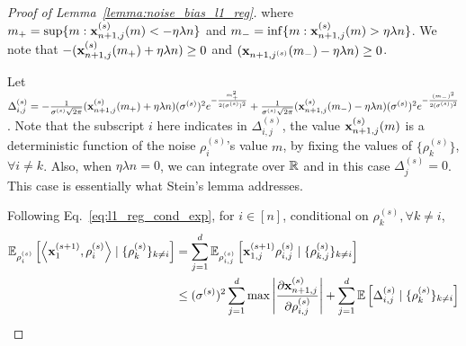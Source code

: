 \begin{proof}[Proof of Lemma~\ref{lemma:noise_bias_l1_reg}]
where $m_{+} = \sup\{m: {\mathbf{x}}_{n+1,j}^{(s)}(m) < -\eta \lambda n\}$ and $m_{-} = \inf\{m: {\mathbf{x}}_{n+1,j}^{(s)}(m) > \eta \lambda n\}$.
We note that $-({\mathbf{x}}_{n+1,j}^{(s)}(m_{+}) + \eta \lambda n) \geq 0$ and $({\mathbf{x}}_{n+1,j^{(s)}}(m_{-}) - \eta \lambda n) \geq 0$. 

Let $\Delta_{i, j}^{(s)} = -\frac{1}{\sigma^{(s)} \sqrt{2\pi}}({\mathbf{x}}_{n+1,j}^{(s)}(m_{+}) + \eta \lambda n) (\sigma^{(s)})^2 e^{-\frac{m_{+}^2}{2 (\sigma^{(s)})^2}}
+ \frac{1}{\sigma^{(s)} \sqrt{2\pi}} ({\mathbf{x}}_{n+1,j}^{(s)}(m_{-}) - \eta \lambda n) (\sigma^{(s)})^2 e^{-\frac{(m_{-})^{2}}{2 (\sigma^{(s)})^2}}$.
Note that the subscript $i$ here indicates in $\Delta_{i, j}^{(s)}$, the value ${\mathbf{x}}_{n+1,j}^{(s)}(m)$ is a deterministic function of the noise $\rho_{i}^{(s)}$'s value $m$, by fixing the values of $\{\rho_{k}^{(s)}\}$, $\forall i\neq k$.
Also, when $\eta \lambda n = 0$, we can integrate over $\mathbb{R}$ and in this case $\Delta_j^{(s)} = 0$. This case is essentially what Stein's lemma addresses. 


Following Eq.~\ref{eq:l1_reg_cond_exp}, for $i\in [n]$, conditional on $\rho_k^{(s)}, \forall k\neq i$,
\begin{align}
    \mathbb{E}_{\rho_i^{(s)}}\left[\left\langle {\mathbf{x}}_{1}^{(s+1)}, \rho_i^{(s)} \right\rangle \mid \{\rho_k^{(s)}\}_{k\neq i}\right]
    &= \sum_{j=1}^{d} \mathbb{E}_{\rho_{i,j}^{(s)}}\left[ {\mathbf{x}}_{1, j}^{(s+1)} \rho_{i, j}^{(s)} \mid \{\rho_{k, j}^{(s)}\}_{k \neq i}\right]\\
    &\leq (\sigma^{(s)})^2 \sum_{j=1}^{d} \max\left| \frac{\partial {\mathbf{x}}_{n+1,j}^{(s)}}{\partial \rho_{i, j}^{(s)}} \right|
    + \sum_{j=1}^{d} \mathbb{E}\left[\Delta_{i,j}^{(s)} \mid \{\rho_k^{(s)}\}_{k\neq i} \right]
\end{align}



\end{proof}
